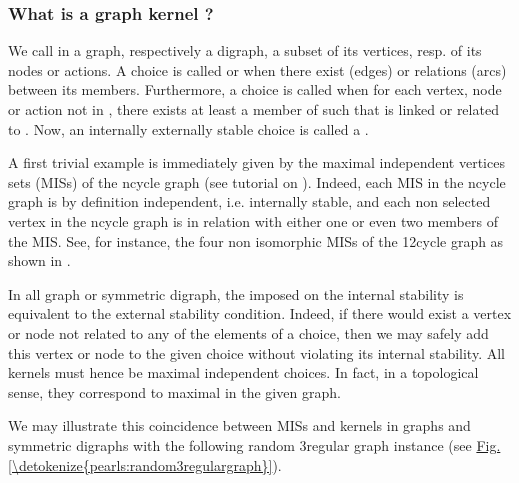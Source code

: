 \documentclass[a4paper,12pt,english]{sphinxhowto}
\begin{document}
\subsubsection{What is a graph kernel ?}
\label{\detokenize{pearls:what-is-a-graph-kernel}}
\sphinxAtStartPar
We call  in a graph, respectively a digraph, a subset of its vertices, resp. of its nodes or actions. A choice  is called  or  when there exist  (edges) or relations (arcs) between its members. Furthermore, a choice  is called  when for each vertex, node or action  not in , there exists at least a member  of  such that  is linked or related to . Now, an internally  externally stable choice is called a .

\sphinxAtStartPar
A first trivial example is immediately given by the maximal independent vertices sets (MISs) of the n\sphinxhyphen{}cycle graph (see tutorial on ). Indeed, each MIS in the n\sphinxhyphen{}cycle graph is by definition independent, i.e. internally stable, and each non selected vertex in the n\sphinxhyphen{}cycle graph is in relation with either one or even two members of the MIS. See, for instance, the four non isomorphic MISs of the 12\sphinxhyphen{}cycle graph as shown in .

\sphinxAtStartPar
In all graph or symmetric digraph, the  imposed on the internal stability is equivalent to the external stability condition. Indeed, if there would exist a vertex or node not related to any of the elements of a choice, then we may safely add this vertex or node to the given choice without violating its internal stability. All kernels must hence be maximal independent choices. In fact, in a topological sense, they correspond to maximal  in the given graph.

\sphinxAtStartPar
We may illustrate this coincidence between MISs and kernels in graphs
and symmetric digraphs with the following random 3\sphinxhyphen{}regular graph
instance (see \hyperref[\detokenize{pearls:random3regulargraph}]{Fig.\@ \ref{\detokenize{pearls:random3regulargraph}}}).
\end{document}

